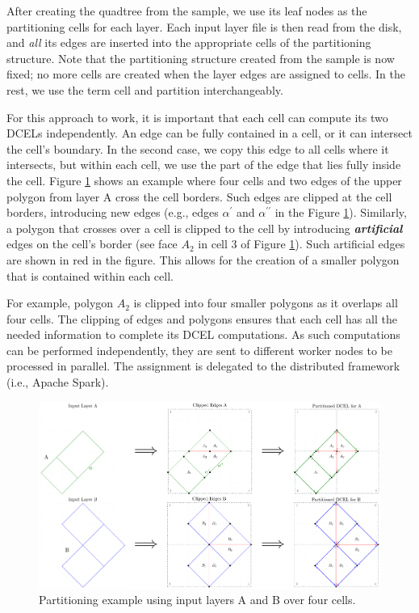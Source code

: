 After creating the quadtree from the sample, we use its leaf nodes as the partitioning cells for each layer. Each input layer file is then read from the disk, and \textit{all} its edges are inserted into the appropriate cells of the partitioning structure. Note that the partitioning structure created from the sample is now fixed; no more cells are created when the layer edges are assigned to cells. In the rest, we use the term cell and partition interchangeably.

For this approach to work, it is important that each cell can compute its two DCELs independently. An edge can be fully contained in a cell, or it can intersect the cell's boundary. In the second case, we copy this edge to all cells where it intersects, but within each cell, we use the part of the edge that lies fully inside the cell. Figure \ref{fig:partition_strategy} shows an example where four cells and two edges of the upper polygon from layer A cross the cell borders. Such edges are clipped at the cell borders, introducing new edges (e.g., edges $\alpha^{\prime}$ and $\alpha^{\prime \prime}$ in the Figure \ref{fig:partition_strategy}).
Similarly, a polygon that crosses over a cell is clipped to the cell by introducing \textit{\textbf{artificial}} edges on the cell's border (see face $A_2$ in cell 3 of Figure \ref{fig:partition_strategy}). Such artificial edges are shown in red in the figure. This allows for the creation of a smaller polygon that is contained within each cell. 

For example, polygon $A_2$ is clipped into four smaller polygons as it overlaps all four cells. The clipping of edges and polygons ensures that each cell has all the needed information to complete its DCEL computations. As such computations can be performed independently, they are sent to different worker nodes to be processed in parallel. The assignment is delegated to the distributed framework (i.e., Apache Spark). 

\begin{figure}
    \centering
    \includegraphics[width=\textwidth]{chapter2/polygons_parted}
    \caption{Partitioning example using input layers A and B over four cells.} \label{fig:partition_strategy}
\end{figure}


